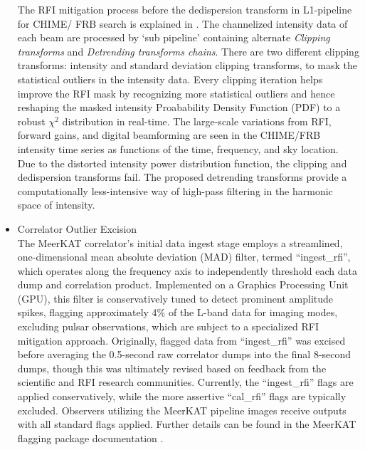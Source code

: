 \begin{itemize}
The RFI mitigation process before the dedispersion transform in L1-pipeline for CHIME/ FRB search is explained in \citep{chime_frb_rfi_2023}. The channelized intensity data of each beam are processed by `sub pipeline' containing alternate \textit{Clipping transforms} and \textit{Detrending transforms chains}. There are two different clipping transforms: intensity and standard deviation clipping transforms, to mask the statistical outliers in the intensity data. Every clipping iteration helps
improve the RFI mask by recognizing more statistical outliers and hence reshaping the masked intensity Proabability Density Function (PDF) to a robust $\chi^2$ distribution in real-time. The large-scale variations from RFI, forward gains, and digital beamforming are seen in the CHIME/FRB intensity time series as functions of the time, frequency, and sky location. Due to the distorted intensity power distribution function, the clipping and dedispersion transforms fail. The proposed detrending transforms provide a computationally less-intensive way of high-pass filtering in the harmonic space of intensity.

\item Correlator Outlier Excision\\
The MeerKAT correlator's initial data ingest stage employs a streamlined, one-dimensional mean absolute deviation (MAD) filter, termed ``ingest\_rfi'', which operates along the frequency axis to independently threshold each data dump and correlation product. Implemented on a Graphics Processing Unit (GPU), this filter is conservatively tuned to detect prominent amplitude spikes, flagging approximately 4\% of the L-band data for imaging modes, excluding pulsar observations, which are subject to a specialized RFI mitigation approach. Originally, flagged data from ``ingest\_rfi'' was excised before averaging the 0.5-second raw correlator dumps into the final 8-second dumps, though this was ultimately revised based on feedback from the scientific and RFI research communities. Currently, the ``ingest\_rfi'' flags are applied conservatively, while the more assertive ``cal\_rfi'' flags are typically excluded. Observers utilizing the MeerKAT pipeline images receive outputs with all standard flags applied. Further details can be found in the MeerKAT flagging package documentation \citep{hugo2022tricolouroptimizedsumthresholdflagger}.


\end{itemize}
